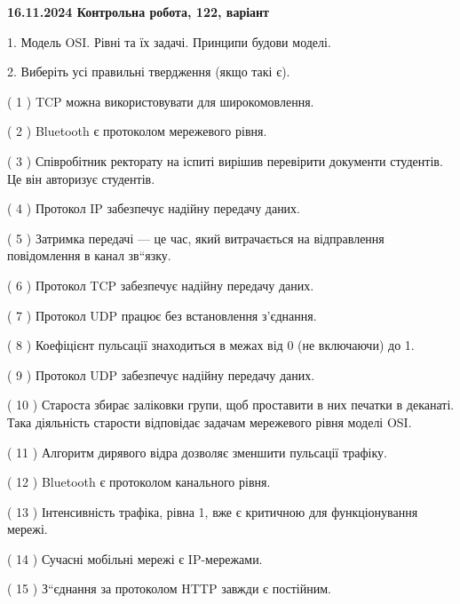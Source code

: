 \documentclass[12pt, ukrainian]{article}
\begin{document}
\vspace{4mm}
\newpage
\begin {large}

\textbf{16.11.2024 Контрольна робота, 122, варіант  }\par


{
1. Модель OSI. Рівні та їх задачі. Принципи будови моделі.



\vspace{5mm}
2. Виберіть усі правильні твердження (якщо такі є).\par
\vspace{2mm}

( 1 ) TCP можна використовувати для широкомовлення.

( 2 ) Bluetooth є протоколом мережевого рівня.

( 3 ) Співробітник ректорату на іспиті вирішив перевірити документи студентів. Це він авторизує студентів.

( 4 ) Протокол IP забезпечує надійну передачу даних.

( 5 ) Затримка передачі — це час, який витрачається на відправлення повідомлення в канал зв“язку.

( 6 ) Протокол TCP забезпечує надійну передачу даних.

( 7 ) Протокол UDP працює без встановлення з'єднання.

( 8 ) Коефіцієнт пульсації знаходиться в межах від 0 (не включаючи) до 1.

( 9 ) Протокол UDP забезпечує надійну передачу даних.

( 10 ) Староста збирає заліковки групи, щоб проставити в них печатки в деканаті. Така діяльність старости відповідає задачам мережевого рівня моделі OSI.

( 11 ) Алгоритм дирявого відра дозволяє зменшити пульсації трафіку.

( 12 ) Bluetooth є протоколом канального рівня.

( 13 ) Інтенсивність трафіка, рівна 1, вже є критичною для функціонування мережі.

( 14 ) Сучасні мобільні мережі є IP-мережами.

( 15 ) З“єднання за протоколом  HTTP завжди є постійним.
}
\end {large}
\end{document}

